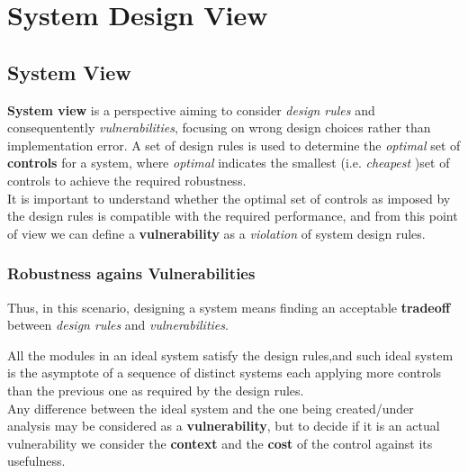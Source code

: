 \chapter{System Design View}


\section{System View}
\textbf{System view} is a perspective aiming to consider \textit{design rules} and consequentently \textit{vulnerabilities},
focusing on wrong design choices rather than
implementation error.
A set of design rules is used to determine the \textit{optimal} set of \textbf{controls} for a system, where \textit{optimal} indicates the smallest (i.e. \textit{cheapest} \smiley)set of controls to achieve the required robustness.\\
It is important to understand whether the optimal set of controls as imposed
by the design rules is compatible with the required performance,
and from this point of view we can define a \textbf{vulnerability} as a \textit{violation} of system design rules.

\subsection{Robustness agains Vulnerabilities}
Thus, in this scenario, designing a system means finding an acceptable \textbf{tradeoff} between \textit{design rules} and \textit{vulnerabilities}.

All the modules in an ideal system satisfy the design rules,and such ideal system is the asymptote of a sequence of distinct systems each applying more controls than the previous one as required by the design rules.\\
Any difference between the ideal system and the one being
created/under analysis may be considered as a \textbf{vulnerability},
but to decide if it is an actual vulnerability we consider the \textbf{context}
and the \textbf{cost} of the control against its usefulness.
\nl

